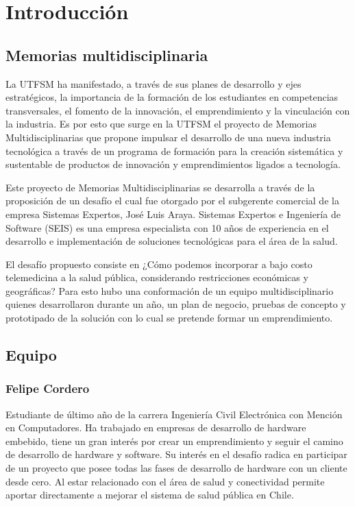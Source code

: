 \chapter{Introducción}\label{intro}

\section{Memorias multidisciplinaria}
La UTFSM ha manifestado, a través de sus planes de desarrollo y ejes estratégicos, la importancia de la formación de los estudiantes en competencias transversales, el fomento de la innovación, el emprendimiento y la vinculación con la industria. Es por esto que surge en la UTFSM el proyecto de Memorias Multidisciplinarias que propone impulsar el desarrollo de una nueva industria tecnológica a través de un programa de formación para la creación sistemática y sustentable de productos de innovación y emprendimientos ligados a tecnología.

Este proyecto de Memorias Multidisciplinarias se desarrolla a través de la proposición de un desafío el cual fue otorgado por el subgerente comercial de la empresa Sistemas Expertos, José Luis Araya. Sistemas Expertos e Ingeniería de Software (SEIS) es una empresa especialista con 10 años de experiencia en el desarrollo e implementación de soluciones tecnológicas para el área de la salud.

El desafío propuesto consiste en ¿Cómo podemos incorporar a bajo costo telemedicina a la salud pública, considerando restricciones económicas y geográficas? Para esto hubo una conformación de un equipo multidisciplinario quienes desarrollaron durante un año, un plan de negocio, pruebas de concepto y prototipado de la solución con lo cual se pretende formar un emprendimiento. 



\newpage
\section{Equipo}

\subsection{Felipe Cordero}
Estudiante de último año de la carrera Ingeniería Civil Electrónica con Mención en Computadores. Ha trabajado en empresas de desarrollo de hardware embebido, tiene un gran interés por crear un emprendimiento y seguir el camino de desarrollo de hardware y software. Su interés en el desafío radica en participar de un proyecto que posee todas las fases de desarrollo de hardware con un cliente desde cero. Al estar relacionado con el área de salud y conectividad  permite aportar directamente a mejorar el sistema de salud pública en Chile. 


